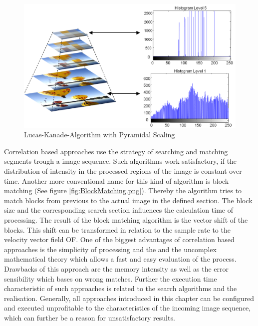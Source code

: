 \begin{figure}[!h]
	\centering
		\includegraphics[width=1\textwidth]{graphic/LucasKanadePyr.png}
\caption{Lucas-Kanade-Algorithm with Pyramidal Scaling}
	\label{fig:LucasKanadePyr.png}
\end{figure}

Correlation based approaches use the strategy of searching and matching segments trough a image sequence. Such algorithms work satisfactory, if the distribution of intensity in the processed regions of the image is constant over time. Another more conventional name for this kind of algorithm is block matching (See figure \ref{fig:BlockMatching.png}). Thereby the algorithm tries to match blocks from previous to the actual image in the defined section.  The block size and the corresponding search section influences the calculation time of processing. The result of the block matching algorithm is the vector shift of the blocks. This shift can be transformed in relation to the sample rate to the velocity vector field \gls{OF}. 
\newpage
One of the biggest advantages of correlation based approaches is the simplicity of processing and the and the uncomplex mathematical theory which allows a fast and easy evaluation of the process.
Drawbacks of this approach are the memory intensity as well as the error sensibility which bases on wrong matches. Further the execution time characteristic of such approaches is related to the search algorithms and the realisation. 
Generally, all approaches introduced in this chapter can be configured and executed unprofitable to the characteristics of the incoming image sequence, which can further be a reason for unsatisfactory results.      


